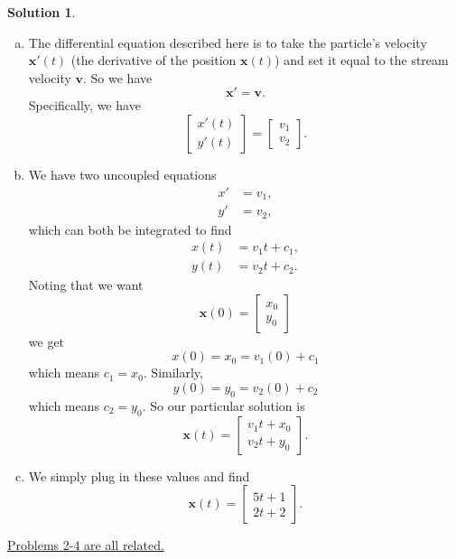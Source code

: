\documentclass[12pt]{report} %
\theoremstyle{definition}
\newtheorem{solution}{Solution}
\begin{document}
\begin{solution}~
\begin{enumerate}[(a)]
    \item The differential equation described here is to take the particle's velocity $\mathbf{x}'(t)$ (the derivative of the position $\mathbf{x}(t)$) and set it equal to the stream velocity $\mathbf{v}$.  So we have
    \[
    \mathbf{x}'=\mathbf{v}.
    \]
    Specifically, we have
    \[
    \begin{bmatrix} x'(t) \\ y'(t) \end{bmatrix} = \begin{bmatrix} v_1 \\ v_2 \end{bmatrix}.
    \]
    \item We have two uncoupled equations
    \begin{align*}
        x' &= v_1,\\
        y' &= v_2,
    \end{align*}
    which can both be integrated to find
    \begin{align*}
        x(t) &= v_1 t +c_1,\\
        y(t) &= v_2 t +c_2.
    \end{align*}
    Noting that we want
    \[
    \mathbf{x}(0)=\begin{bmatrix} x_0 \\ y_0 \end{bmatrix}
    \]
    we get
    \[
    x(0)=x_0=v_1(0)+c_1
    \]
    which means $c_1=x_0$. Similarly,
    \[
    y(0)=y_0=v_2(0)+c_2
    \]
    which means $c_2=y_0$.  So our particular solution is
    \[
    \mathbf{x}(t) = \begin{bmatrix} v_1t+x_0 \\ v_2t+y_0 \end{bmatrix}.
    \]
    \item We simply plug in these values and find
    \[
    \mathbf{x}(t) = \begin{bmatrix} 5t+1 \\ 2t+2 \end{bmatrix}.
    \]
\end{enumerate}
\end{solution}

\begin{center}\underline{Problems 2-4 are all related.}
\end{center}
\end{document}
